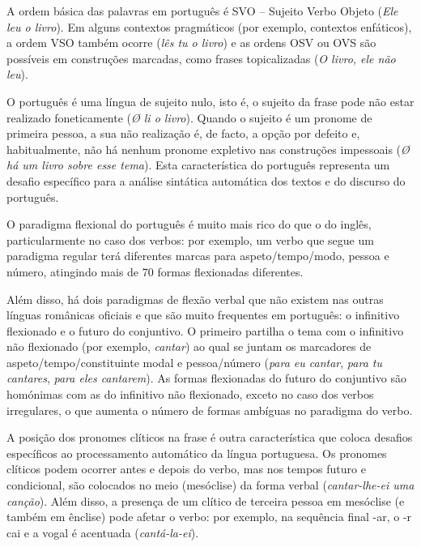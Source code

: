 \begin{multicols}{2}
A ordem básica das palavras em português é SVO – Sujeito Verbo Objeto (\textit{Ele leu o livro}). Em alguns contextos pragmáticos (por exemplo, contextos enfáticos), a ordem VSO também ocorre (\textit{lês tu o livro}) e as ordens OSV ou OVS são possíveis em construções marcadas, como frases topicalizadas (\textit{O livro, ele não leu}).




O português é uma língua de sujeito nulo, isto é, o sujeito da frase pode não estar realizado foneticamente (\textit{Ø li o livro}). Quando o sujeito é um pronome de primeira pessoa, a sua não realização é, de facto, a opção por defeito e, habitualmente, não há ne\-nhum pronome expletivo nas construções impessoais (\textit{Ø há um livro sobre esse tema}). Esta característica do português representa um desafio específico para a análise sintática automática dos textos e do discurso do português.

O paradigma flexional do português é muito mais rico do que o do inglês, particularmente no caso dos verbos: por exemplo, um verbo que segue um paradigma regular terá diferentes marcas para aspeto/tempo/modo, pessoa e número, atingindo mais de 70 formas flexionadas diferentes.


Além disso, há dois paradigmas de flexão verbal que não existem nas outras línguas românicas oficiais e que são muito frequentes em português: o infinitivo flexionado e o futuro do conjuntivo. O primeiro partilha o tema com o infinitivo não flexionado (por exemplo, \textit{cantar}) ao qual se juntam os marcadores de aspeto/tempo/constituinte modal e pessoa/número (\textit{para eu cantar}, \textit{para tu cantares}, \textit{para eles cantarem}). As formas flexionadas do futuro do conjuntivo são homónimas com as do infinitivo não flexionado, exceto no caso dos verbos irregulares, o que aumenta o número de formas ambíguas no paradigma do verbo.

A posição dos pronomes clíticos na frase é outra ca\-rac\-te\-rís\-ti\-ca que coloca desafios específicos ao processamento automático da língua portuguesa. Os pronomes clíticos podem ocorrer antes e depois do verbo, mas nos tempos futuro e condicional, são colocados no meio (mesóclise) da forma verbal (\textit{cantar-lhe-ei uma canção}). Além disso, a presença de um clítico de terceira pessoa em mesóclise (e também em ênclise) pode afetar o verbo: por exemplo, na sequência final -ar, o -r cai e a vogal é acentuada (\textit{cantá-la-ei}).




\end{multicols}
